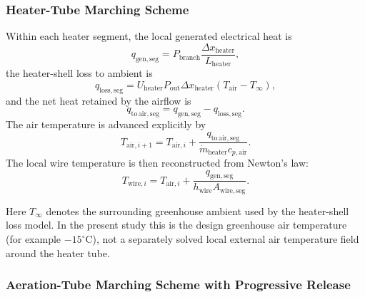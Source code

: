 \documentclass{article}
\begin{document}
\subsubsection{Heater-Tube Marching Scheme}

Within each heater segment, the local generated electrical heat is
\begin{equation}
q_{\mathrm{gen,seg}}
= P_{\mathrm{branch}}
\frac{\Delta x_{\mathrm{heater}}}{L_{\mathrm{heater}}},
\end{equation}
the heater-shell loss to ambient is
\begin{equation}
q_{\mathrm{loss,seg}}
= U_{\mathrm{heater}} P_{\mathrm{out}} \Delta x_{\mathrm{heater}}
(T_{\mathrm{air}} - T_{\infty}),
\end{equation}
and the net heat retained by the airflow is
\begin{equation}
q_{\mathrm{to\,air,seg}}
= q_{\mathrm{gen,seg}} - q_{\mathrm{loss,seg}}.
\end{equation}
The air temperature is advanced explicitly by
\begin{equation}
T_{\mathrm{air},i+1}
= T_{\mathrm{air},i}
+ \frac{q_{\mathrm{to\,air,seg}}}
{\dot{m}_{\mathrm{heater}} c_{p,\mathrm{air}}}.
\end{equation}
The local wire temperature is then reconstructed from Newton's law:
\begin{equation}
T_{\mathrm{wire},i}
= T_{\mathrm{air},i}
+ \frac{q_{\mathrm{gen,seg}}}
{h_{\mathrm{wire}} A_{\mathrm{wire,seg}}}.
\end{equation}

Here $T_{\infty}$ denotes the surrounding greenhouse ambient used by the
heater-shell loss model. In the present study this is the design greenhouse
air temperature (for example $-15^\circ\mathrm{C}$), not a separately solved
local external air temperature field around the heater tube.

\subsubsection{Aeration-Tube Marching Scheme with Progressive Release}
\end{document}
